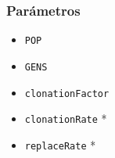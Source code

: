 \frame
{
\frametitle{Parámetros}
\begin{itemize}
    \item \texttt{POP} \blue{[10,210]}
    \item \texttt{GENS} \blue{[10,2000,30]}
    \item \texttt{clonationFactor} \blue{[0,1]}
    \item \texttt{clonationRate}   \blue{[0,1]} *
    \item \texttt{replaceRate}     \blue{[0,1]} *
\end{itemize}
}


